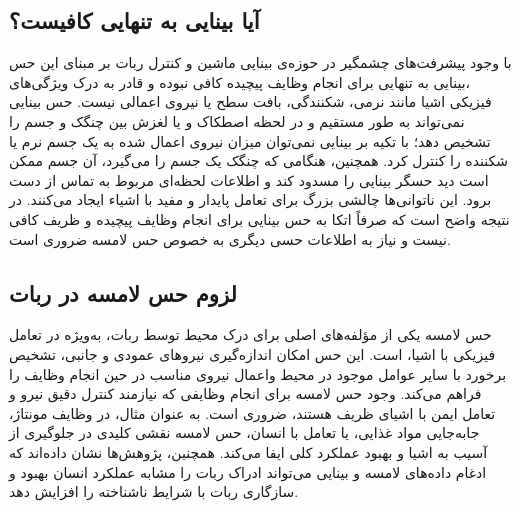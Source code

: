 \subsection{آیا بینایی به تنهایی کافیست؟}

با وجود پیشرفت‌های چشمگیر در حوزه‌ی بینایی ماشین
و کنترل ربات بر مبنای این حس
،بینایی به تنهایی برای انجام وظایف پیچیده کافی نبوده و قادر به درک ویژگی‌های فیزیکی اشیا مانند نرمی، شکنندگی، بافت سطح یا نیروی اعمالی نیست. حس بینایی نمی‌تواند به طور مستقیم و در لحظه اصطکاک و یا لغزش بین چنگک و جسم را تشخیص دهد؛ با تکیه بر بینایی نمی‌توان میزان نیروی اعمال شده به یک جسم نرم یا شکننده را کنترل کرد.
\cite{yamaguchi2019recent,chi2018recent}
همچنین، هنگامی که چنگک
 یک جسم را می‌گیرد، آن جسم ممکن است دید حسگر بینایی را مسدود کند و اطلاعات لحظه‌ای مربوط به تماس از دست برود. این ناتوانی‌ها چالشی بزرگ برای تعامل پایدار و مفید با اشیاء ایجاد می‌کنند. در نتیجه واضح است که صرفاً اتکا به حس بینایی برای انجام وظایف پیچیده و ظریف کافی نیست و نیاز به اطلاعات حسی دیگری به‌ خصوص حس لامسه ضروری است.
\subsection{لزوم حس لامسه در ربات}
حس لامسه یکی از مؤلفه‌های اصلی برای درک محیط توسط ربات، به‌ویژه در تعامل فیزیکی با اشیا، است. این حس امکان اندازه‌گیری نیروهای عمودی و جانبی، تشخیص برخورد با سایر عوامل موجود در محیط واعمال نیروی مناسب در حین انجام وظایف را فراهم می‌کند.
\cite{zou2017novel, yousef2011tactile}
وجود حس لامسه برای انجام وظایفی که نیازمند کنترل دقیق نیرو و تعامل ایمن با اشیای ظریف هستند، ضروری است. به عنوان مثال، در وظایف مونتاژ، جابه‌جایی مواد غذایی، یا تعامل با انسان، حس لامسه نقشی کلیدی در جلوگیری از آسیب به اشیا و بهبود عملکرد کلی ایفا می‌کند.
همچنین، پژوهش‌ها نشان داده‌اند که ادغام داده‌های لامسه و بینایی می‌تواند ادراک ربات را مشابه عملکرد انسان بهبود و سازگاری ربات با شرایط ناشناخته را افزایش دهد.
\cite{dahiya2013robotic}


